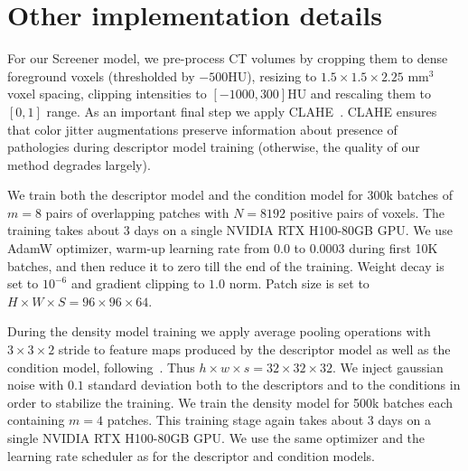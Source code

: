 \section{Other implementation details}
\label{appendix:details}

For our Screener model, we pre-process CT volumes by cropping them to dense foreground voxels (thresholded by $-500$HU), resizing to $1.5 \times 1.5 \times 2.25$ mm$^3$ voxel spacing, clipping intensities to $[-1000, 300]$HU and rescaling them to $[0, 1]$ range. As an important final step we apply CLAHE~\cite{clahe}. CLAHE ensures that color jitter augmentations preserve information about presence of pathologies during descriptor model training (otherwise, the quality of our method degrades largely).

We train both the descriptor model and the condition model for 300k batches of $m = 8$ pairs of overlapping patches with $N = 8192$ positive pairs of voxels. The training takes about $3$ days on a single NVIDIA RTX H100-80GB GPU. We use AdamW optimizer, warm-up learning rate from $0.0$ to $0.0003$ during first 10K batches, and then reduce it to zero till the end of the training. Weight decay is set to $10^{-6}$ and gradient clipping to $1.0$ norm. Patch size is set to $H \times W \times S = 96 \times 96 \times 64$.

During the density model training we apply average pooling operations with $3 \times 3 \times 2$ stride to feature maps produced by the descriptor model as well as the condition model, following~\cite{cflow,msflow}. Thus $h \times w \times s = 32 \times 32 \times 32$. We inject gaussian noise with $0.1$ standard deviation both to the descriptors and to the conditions in order to stabilize the training. We train the density model for 500k batches each containing $m = 4$ patches. This training stage again takes about $3$ days on a single NVIDIA RTX H100-80GB GPU. We use the same optimizer and the learning rate scheduler as for the descriptor and condition models.